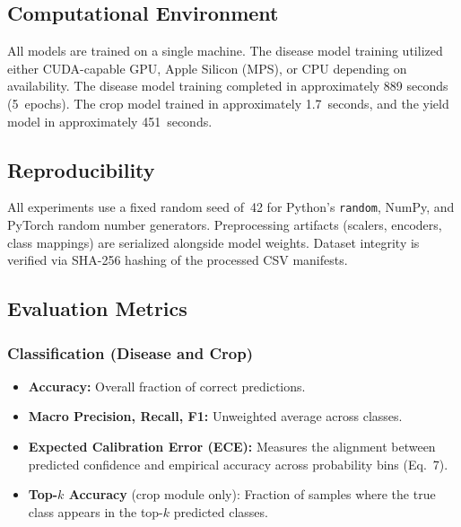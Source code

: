 \documentclass[conference]{IEEEtran}
\begin{document}
\subsection{Computational Environment}
All models are trained on a single machine. The disease model training utilized either CUDA-capable GPU, Apple Silicon (MPS), or CPU depending on availability. The disease model training completed in approximately 889 seconds (5~epochs). The crop model trained in approximately 1.7~seconds, and the yield model in approximately 451~seconds.

\subsection{Reproducibility}
All experiments use a fixed random seed of~42 for Python's \texttt{random}, NumPy, and PyTorch random number generators. Preprocessing artifacts (scalers, encoders, class mappings) are serialized alongside model weights. Dataset integrity is verified via SHA-256 hashing of the processed CSV manifests.

\subsection{Evaluation Metrics}

\subsubsection{Classification (Disease and Crop)}
\begin{itemize}[leftmargin=*]
  \item \textbf{Accuracy:} Overall fraction of correct predictions.
  \item \textbf{Macro Precision, Recall, F1:} Unweighted average across classes.
  \item \textbf{Expected Calibration Error (ECE):} Measures the alignment between predicted confidence and empirical accuracy across probability bins (Eq.~7).
  \item \textbf{Top-$k$ Accuracy} (crop module only): Fraction of samples where the true class appears in the top-$k$ predicted classes.
\end{itemize}
\end{document}
